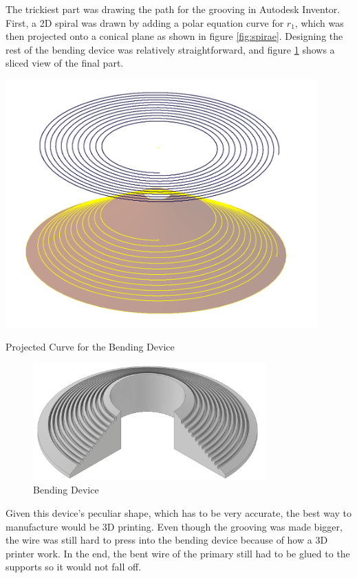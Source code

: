 The trickiest part was drawing the path for the grooving in Autodesk Inventor. First, a 2D spiral was drawn by adding a polar equation curve for \(r_1\), which was then projected onto a conical plane as shown in figure \ref{fig:spirae}. Designing the rest of the bending device was relatively straightforward, and figure \ref{fig:biegbieg} shows a sliced view of the final part.

\begin{marginfigure}[-3cm]
    \centering
    \includegraphics[width=0.9\textwidth]{kassandra/resources/JerJerWoBistDuSpirae.PNG}
    \caption{Projected Curve for the Bending Device}
    \label{fig:spirae}
\end{marginfigure}

\begin{figure}[h!]
    \centering
    \includegraphics[width=0.8\textwidth]{kassandra/resources/JerJerWoBistDuBiegeBieg.PNG}
    \caption{Bending Device}
    \label{fig:biegbieg}
\end{figure}

Given this device's peculiar shape, which has to be very accurate, the best way to manufacture would be 3D printing. Even though the grooving was made bigger, the wire was still hard to press into the bending device because of how a 3D printer work. In the end, the bent wire of the primary still had to be glued to the supports so it would not fall off.

